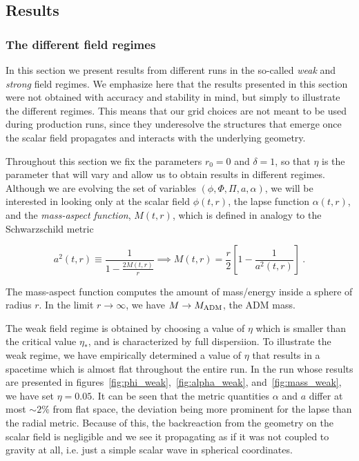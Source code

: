 \documentclass[a4paper,11pt]{article}
\renewcommand{\a}{\alpha}
\renewcommand{\d}{\delta}
\newcommand{\lrpar}[1]{\left( #1 \right)}
\newcommand{\lrsquare}[1]{\left[ #1 \right]}
\newcommand{\n}{\noindent}
\newcommand{\eq}[1]{
  \begin{equation}
    #1
  \end{equation}
}
\begin{document}
\subsection{Results}

\subsubsection{The different field regimes}

In this section we present results from different runs in the so-called \emph{weak} and \emph{strong} field regimes. We emphasize here that the results presented in this section were not obtained with accuracy and stability in mind, but simply to illustrate the different regimes. This means that our grid choices are not meant to be used during production runs, since they underesolve the structures that emerge once the scalar field propagates and interacts with the underlying geometry.

Throughout this section we fix the parameters $r_{0}=0$ and $\d=1$, so that $\eta$ is the parameter that will vary and allow us to obtain results in different regimes. Although we are evolving the set of variables $\lrpar{\phi,\Phi,\Pi,a,\a}$, we will be interested in looking only at the scalar field $\phi(t,r)$, the lapse function $\a(t,r)$, and the \emph{mass-aspect function}, $M(t,r)$, which is defined in analogy to the Schwarzschild metric

\eq{a^{2}(t,r) \equiv \frac{1}{1 - \frac{2M(t,r)}{r}} \implies M(t,r) = \frac{r}{2}\lrsquare{1 - \frac{1}{a^{2}(t,r)}}\ .}

\n The mass-aspect function computes the amount of mass/energy inside a sphere of radius $r$. In the limit $r\to\infty$, we have $M\to M_{\rm ADM}$, the ADM mass.

The weak field regime is obtained by choosing a value of $\eta$ which is smaller than the critical value $\eta_{*}$, and is characterized by full dispersiion. To illustrate the weak regime, we have empirically determined a value of $\eta$ that results in a spacetime which is almost flat throughout the entire run. In the run whose results are presented in figures~\ref{fig:phi_weak},~\ref{fig:alpha_weak}, and~\ref{fig:mass_weak}, we have set $\eta=0.05$. It can be seen that the metric quantities $\a$ and $a$ differ at most $\sim2\%$ from flat space, the deviation being more prominent for the lapse than the radial metric. Because of this, the backreaction from the geometry on the scalar field is negligible and we see it propagating as if it was not coupled to gravity at all, i.e. just a simple scalar wave in spherical coordinates.
\end{document}
